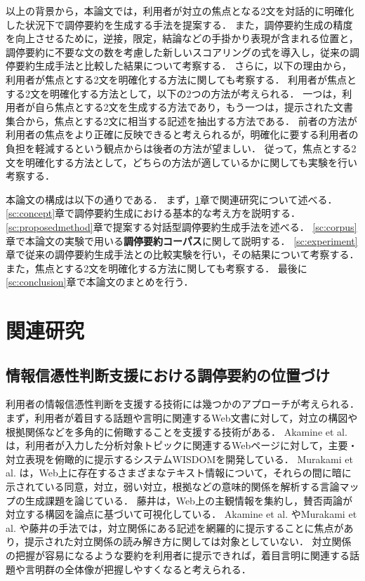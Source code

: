 \documentclass[japanese]{jnlp_1.4}
\begin{document}
以上の背景から，本論文では，利用者が対立の焦点となる2文を対話的に明確化した状況下で調停要約を生成する手法を提案する．
また，調停要約生成の精度を向上させるために，逆接，限定，結論などの手掛かり表現が含まれる位置と，調停要約に不要な文の数を考慮した新しいスコアリングの式を導入し，従来の調停要約生成手法と比較した結果について考察する．
さらに，以下の理由から，利用者が焦点とする2文を明確化する方法に関しても考察する．
利用者が焦点とする2文を明確化する方法として，以下の2つの方法が考えられる．
一つは，利用者が自ら焦点とする2文を生成する方法であり，もう一つは，提示された文書集合から，焦点とする2文に相当する記述を抽出する方法である．
前者の方法が利用者の焦点をより正確に反映できると考えられるが，明確化に要する利用者の負担を軽減するという観点からは後者の方法が望ましい．
従って，焦点とする2文を明確化する方法として，どちらの方法が適しているかに関しても実験を行い考察する．

本論文の構成は以下の通りである．
まず，\ref{sc:relatedwork}章で関連研究について述べる．
\ref{sc:concept}章で調停要約生成における基本的な考え方を説明する．
\ref{sc:proposedmethod}章で提案する対話型調停要約生成手法を述べる．
\ref{sc:corpus}章で本論文の実験で用いる{\bf 調停要約コーパス}に関して説明する．
\ref{sc:experiment}章で従来の調停要約生成手法との比較実験を行い，その結果について考察する．
また，焦点とする2文を明確化する方法に関しても考察する．
最後に\ref{sc:conclusion}章で本論文のまとめを行う．



\section{関連研究}
\label{sc:relatedwork}

\subsection{情報信憑性判断支援における調停要約の位置づけ}

利用者の情報信憑性判断を支援する技術には幾つかのアプローチが考えられる．
まず，利用者が着目する話題や言明に関連するWeb文書に対して，対立の構図や根拠関係などを多角的に俯瞰することを支援する技術がある．
Akamine et al. \cite{Akamine2010,Akamine2009}は，利用者が入力した分析対象トピックに関連するWebページに対して，主要・対立表現を俯瞰的に提示するシステムWISDOMを開発している．
Murakami et al. \citeyear{Murakami2010}は，Web上に存在するさまざまなテキスト情報について，それらの間に暗に示されている同意，対立，弱い対立，根拠などの意味的関係を解析する言論マップの生成課題を論じている．
藤井\citeyear{Fujii2008}は，Web上の主観情報を集約し，賛否両論が対立する構図を論点に基づいて可視化している．
Akamine et al. \citeyear{Akamine2010,Akamine2009}やMurakami et al. \citeyear{Murakami2010}や藤井\citeyear{Fujii2008}の手法では，対立関係にある記述を網羅的に提示することに焦点があり，提示された対立関係の読み解き方に関しては対象としていない．
対立関係の把握が容易になるような要約を利用者に提示できれば，着目言明に関連する話題や言明群の全体像が把握しやすくなると考えられる．
\end{document}
